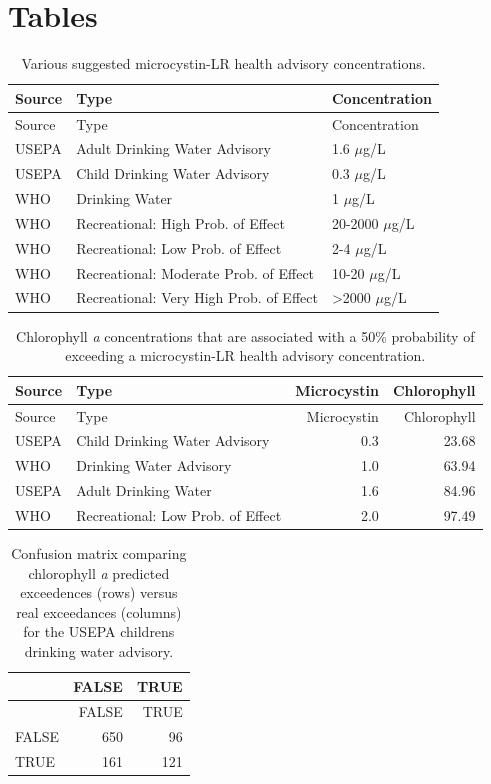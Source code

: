 \documentclass[11pt,]{article}
\begin{document}
\newpage

\section{Tables}\label{tables}

\begin{longtable}[c]{@{}lll@{}}
\caption{Various suggested microcystin-LR health advisory
concentrations. \label{tab:microcystin_levels}}\tabularnewline
\toprule
Source & Type & Concentration\tabularnewline
\midrule
\endfirsthead
\toprule
Source & Type & Concentration\tabularnewline
\midrule
\endhead
USEPA & Adult Drinking Water Advisory & 1.6 \(\mu\)g/L\tabularnewline
USEPA & Child Drinking Water Advisory & 0.3 \(\mu\)g/L\tabularnewline
WHO & Drinking Water & 1 \(\mu\)g/L\tabularnewline
WHO & Recreational: High Prob. of Effect & 20-2000
\(\mu\)g/L\tabularnewline
WHO & Recreational: Low Prob. of Effect & 2-4 \(\mu\)g/L\tabularnewline
WHO & Recreational: Moderate Prob. of Effect & 10-20
\(\mu\)g/L\tabularnewline
WHO & Recreational: Very High Prob. of Effect & \textgreater{}2000
\(\mu\)g/L\tabularnewline
\bottomrule
\end{longtable}

\newpage

\begin{longtable}[c]{@{}llrr@{}}
\caption{Chlorophyll \textit{a} concentrations that are associated with
a 50\% probability of exceeding a microcystin-LR health advisory
concentration. \label{tab:mc_chla_table}}\tabularnewline
\toprule
Source & Type & Microcystin & Chlorophyll\tabularnewline
\midrule
\endfirsthead
\toprule
Source & Type & Microcystin & Chlorophyll\tabularnewline
\midrule
\endhead
USEPA & Child Drinking Water Advisory & 0.3 & 23.68\tabularnewline
WHO & Drinking Water Advisory & 1.0 & 63.94\tabularnewline
USEPA & Adult Drinking Water & 1.6 & 84.96\tabularnewline
WHO & Recreational: Low Prob. of Effect & 2.0 & 97.49\tabularnewline
\bottomrule
\end{longtable}

\newpage

\begin{longtable}[c]{@{}lrr@{}}
\caption{Confusion matrix comparing chlorophyll \textit{a} predicted
exceedences (rows) versus real exceedances (columns) for the USEPA
childrens drinking water advisory.
\label{tab:child_conmat_table}}\tabularnewline
\toprule
& FALSE & TRUE\tabularnewline
\midrule
\endfirsthead
\toprule
& FALSE & TRUE\tabularnewline
\midrule
\endhead
FALSE & 650 & 96\tabularnewline
TRUE & 161 & 121\tabularnewline
\bottomrule
\end{longtable}
\end{document}
